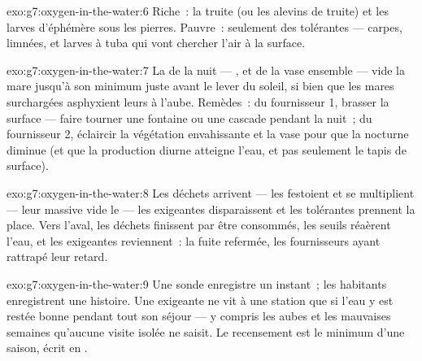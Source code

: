 \begin{solution}{exo:g7:oxygen-in-the-water:6}
Riche~: la truite (ou les alevins de truite) et les larves
d'éphémère sous les pierres. Pauvre~: seulement des 
tolérantes --- carpes, limnées, et larves à tuba qui vont chercher
l'air à la surface.
\end{solution}

\begin{solution}{exo:g7:oxygen-in-the-water:7}
La  de la nuit --- ,  et  de
la vase ensemble --- vide la mare jusqu'à son minimum juste avant le
lever du soleil, si bien que les mares surchargées asphyxient leurs
 à l'aube. Remèdes~: du fournisseur 1, brasser la surface
--- faire tourner une fontaine ou une cascade pendant la nuit~; du
fournisseur 2, éclaircir la végétation envahissante et la vase pour
que la  nocturne diminue (et que la production diurne
atteigne l'eau, et pas seulement le tapis de surface).
\end{solution}

\begin{solution}{exo:g7:oxygen-in-the-water:8}
Les déchets arrivent --- les  festoient et se
multiplient --- leur  massive vide le  --- les
 exigeantes disparaissent et les tolérantes prennent la
place. Vers l'aval, les déchets finissent par être consommés, les
seuils réaèrent l'eau, et les  exigeantes reviennent~: la
fuite refermée, les fournisseurs ayant rattrapé leur retard.
\end{solution}

\begin{solution}{exo:g7:oxygen-in-the-water:9}
Une sonde enregistre un instant~; les habitants enregistrent une
histoire. Une  exigeante ne vit à une station que si l'eau y
est restée bonne pendant tout son séjour --- y compris les aubes et
les mauvaises semaines qu'aucune visite isolée ne saisit. Le
recensement est le minimum d'une saison, écrit en .
\end{solution}

